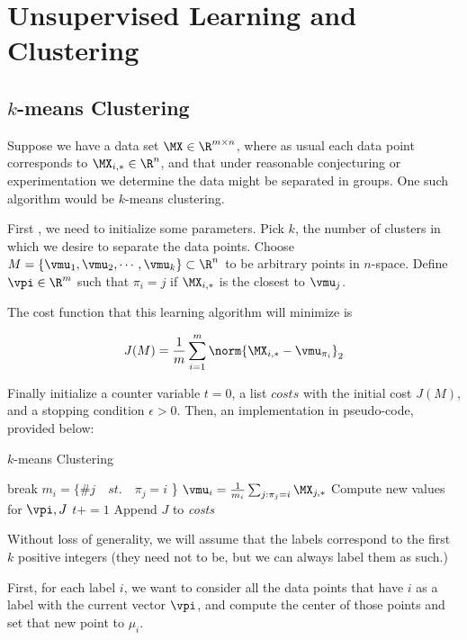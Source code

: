\chapter{Unsupervised Learning and Clustering}

\section{$k$-means Clustering}

Suppose we have a data set $\MX\in\R^{m \times n}$, where as usual each data point corresponds to $\MX_{i,*}\in\R^n$, and that under reasonable conjecturing or experimentation we determine the data might be separated in groups. One such algorithm would be $k$-means clustering.

First , we need to initialize some parameters. Pick $k$, the number of clusters in which we desire to separate the data points. Choose $M=\{\vmu_1, \vmu_2, \cdots, \vmu_k\} \subset\R^n$ to be arbitrary points in $n$-space. Define $\vpi\in\R^m$ such that $\pi_i = j$ if $\MX_{i,*}$ is the closest to $\vmu_j$. 

The cost function that this learning algorithm will minimize is

$$J(M) = \frac{1}{m} \sum_{i=1}^{m} \norm{ \MX_{i,*} - \vmu_{\pi_i}}_2 $$ 

Finally initialize a counter variable $t=0$, a list $\textit{costs}$ with the initial cost $J(M)$, and a stopping condition $\epsilon>0$. Then, an implementation in pseudo-code, provided below:

\begin{algorithm}
    \caption{$k$-means Clustering}
    \begin{algorithmic}[1]
		\State break
		\EndIf
        \State $m_i =\{ \#j \quad st. \quad \pi_j = i$ \}
        \State $\vmu_i = \frac{1}{m_i}\sum_{j:\pi_j=i} \MX_{j,*}$
		\EndFor
		\State Compute new values for $\vpi, J$
		\State $t+=1$
		\State Append $J$ to \textit{costs}
		\EndWhile
	\end{algorithmic} 
\end{algorithm}

Without loss of generality, we will assume that the labels correspond to the first $k$ positive integers (they need not to be, but we can always label them as such.)

First, for each label $i$, we want to consider all the data points that have $i$ as a label with the current vector $\vpi$, and compute the center of those points and set that new point to $\mu_i$.

